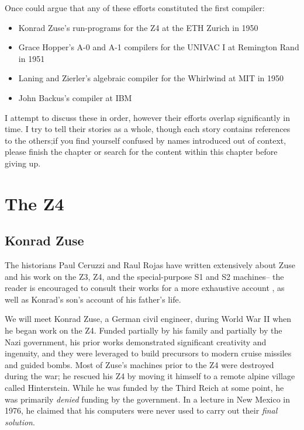 \bigskip
Once could argue that any of these efforts constituted the first compiler:
\begin{itemize}
	\item Konrad Zuse's run-programs for the Z4 at the ETH Zurich in 1950
	\item Grace Hopper's A-0 and A-1 compilers for the UNIVAC I at
	      Remington Rand in 1951
	\item Laning and Zierler's algebraic compiler for the Whirlwind at MIT in 1950
	\item John Backus's \FTNI{} compiler at IBM
\end{itemize}

I attempt to discuss these in order, however their efforts overlap
significantly in time. I try to tell their stories as a whole, though each story
contains references to the others;if you find yourself confused by names
introduced out of context, please finish the chapter or search for the content
within this chapter before giving up.

\section{The Z4}
\subsection{Konrad Zuse}

The historians Paul Ceruzzi and Raul Rojas have written extensively about
Zuse and his work on the Z3, Z4, and the special-purpose S1 and S2 machines--
the reader is encouraged to consult their works for a more exhaustive account
\cite{ceruzzi_early_computers_of_zuse_1981}
\cite{rojas_arch_of_zuses_machines_2000},
as well as Konrad's son's account of his father's life\cite{zuse2009life}.

We will meet Konrad Zuse, a German civil engineer, during World War II when
he began work on the Z4.
Funded partially by his family and partially by the Nazi government, his
prior works demonstrated significant creativity and ingenuity, and they were
leveraged to build precursors to modern cruise missiles and guided bombs. Most of
Zuse's machines prior to the Z4 were destroyed during the war;
he rescued his Z4 by moving it himself to a remote alpine village
called Hinterstein\cite{Knuth_TrabbPardo_1976_Early_Development}.
While he was funded by the Third Reich at some point, he was primarily \textit{denied}
funding by the government. In a lecture in New Mexico in 1976, he claimed
that his computers were never used to carry out their \textit{final solution}.

